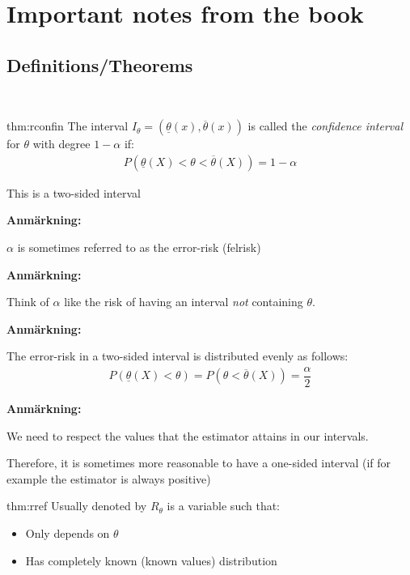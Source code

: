 \section{Important notes from the book}
\subsection{Definitions/Theorems}\hfill\\
\par\bigskip
\begin{theo}{thm:rconfin}
  The interval $I_\theta = (\underline{\theta}(x),\overline{\theta}(x))$ is called the \textit{confidence interval} for $\theta$ with degree $1-\alpha$ if:
  \begin{equation*}
    \begin{gathered}
      P(\underline{\theta}(X)<\theta<\overline{\theta}(X))=1-\alpha
    \end{gathered}
  \end{equation*}
  \par\bigskip
  \noindent This is a two-sided interval
\end{theo}
\par\bigskip
\noindent\textbf{Anmärkning:}\par
\noindent $\alpha$ is sometimes referred to as the error-risk (felrisk)
\par\bigskip
\noindent\textbf{Anmärkning:}\par
\noindent Think of $\alpha$ like the risk of having an interval \textit{not} containing $\theta$.
\par\bigskip
\noindent\textbf{Anmärkning:}\par
\noindent The error-risk in a two-sided interval is distributed evenly as follows:
\begin{equation*}
  \begin{gathered}
    P(\underline{\theta}(X)<\theta) = P(\theta<\overline{\theta}(X))=\dfrac{\alpha}{2}
  \end{gathered}
\end{equation*}
\par\bigskip
\noindent\textbf{Anmärkning:}\par
\noindent We need to respect the values that the estimator attains in our intervals.\par
\noindent Therefore, it is sometimes more reasonable to have a one-sided interval (if for example the estimator is always positive)
\par\bigskip
\begin{theo}{thm:rref}
  Usually denoted by $R_\theta$ is a variable such that:\par
  \begin{itemize}
    \item Only depends on $\theta$
    \item Has completely known (known values) distribution
  \end{itemize}
\end{theo}
